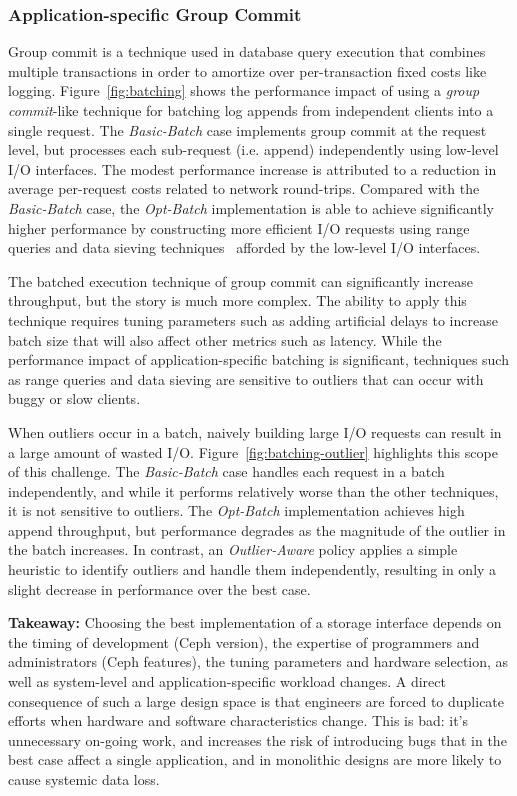 \subsubsection{Application-specific Group Commit}

Group commit is a technique used in database query execution that combines
multiple transactions in order to amortize over per-transaction fixed costs
like logging. Figure~\ref{fig:batching} shows the performance impact of using
a \emph{group commit}-like technique for batching log appends from independent
clients into a single request.  The \emph{Basic-Batch} case implements group
commit at the request level, but processes each sub-request (i.e.  append)
independently using low-level I/O interfaces. The modest performance increase
is attributed to a reduction in average per-request costs related to network
round-trips. Compared with the \emph{Basic-Batch} case, the \emph{Opt-Batch}
implementation is able to achieve significantly higher performance by
constructing more efficient I/O requests using range queries and data sieving
techniques~\cite{x} afforded by the low-level I/O interfaces.

The batched execution technique of group commit can significantly increase
throughput, but the story is much more complex. The ability to apply this
technique requires tuning parameters such as adding artificial delays to
increase batch size that will also affect other metrics such as latency.
While the performance impact of application-specific batching is significant,
techniques such as range queries and data sieving are sensitive to outliers
that can occur with buggy or slow clients.

When outliers occur in a batch, naively building large I/O requests can result
in a large amount of wasted I/O.  Figure~\ref{fig:batching-outlier} highlights
this scope of this challenge. The \emph{Basic-Batch} case handles each request
in a batch independently, and while it performs relatively worse than the
other techniques, it is not sensitive to outliers. The \emph{Opt-Batch}
implementation achieves high append throughput, but performance degrades as
the magnitude of the outlier in the batch increases. In contrast, an
\emph{Outlier-Aware} policy applies a simple heuristic to identify outliers
and handle them independently, resulting in only a slight decrease in
performance over the best case.

\textbf{Takeaway:} Choosing the best implementation of a storage interface
depends on the timing of development (Ceph version), the expertise of
programmers and administrators (Ceph features), the tuning parameters and hardware
selection, as well as system-level and application-specific workload changes.
A direct consequence of such a large design space is that engineers are forced
to duplicate efforts when hardware and software characteristics change. This
is bad: it's unnecessary on-going work, and increases the risk of introducing
bugs that in the best case affect a single application, and in monolithic
designs are more likely to cause systemic data loss.

